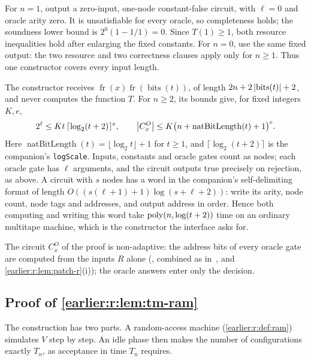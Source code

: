 For \(n=1\), output a zero-input, one-node constant-false circuit,
with \(\ell=0\) and oracle arity zero. It is unsatisfiable for every
oracle, so completeness holds; the soundness lower bound is
\(2^0(1-1/1)=0\). Since \(T(1)\ge1\), both resource inequalities hold
after enlarging the fixed constants. For \(n=0\), use the same fixed
output: the two resource and two correctness clauses apply only for
\(n\ge1\). Thus one constructor covers every input length.

The constructor receives
\(\operatorname{fr}(x)\operatorname{fr}(\operatorname{bits}(t))\), of
length \(2n+2\left|\operatorname{bits}(t)\right|+2\), and never computes the
function \(T\). For \(n\ge2\), its bounds give, for fixed integers
\(K,e\),
\[
 2^\ell\le Kt\,\lceil\log_2(t+2)\rceil^e,
 \qquad
 \left|C_x^O\right|\le K\bigl(n+\operatorname{natBitLength}(t)+1\bigr)^e.
\]
Here \(\operatorname{natBitLength}(t)=\lfloor\log_2t\rfloor+1\) for
\(t\ge1\), and \(\lceil\log_2(t+2)\rceil\) is the companion's
\texttt{logScale}. Inputs, constants and oracle gates count as nodes;
each oracle gate has \(\ell\) arguments, and the circuit outputs true
precisely on rejection, as above. A circuit with \(s\) nodes has a word
in the companion's self-delimiting format of length
\(O((s(\ell+1)+1)\log(s+\ell+2))\): write its arity, node count, node
tags and addresses, and output address in order. Hence both computing
and writing this word take \(\operatorname{poly}(n,\log(t+2))\) time on an ordinary
multitape machine, which is the constructor the interface asks for.

\begin{remark}\label{earlier:r:rem:short-pcp-nonadaptive}
The circuit \(C^O_x\) of the proof is non-adaptive: the address bits of
every oracle gate are computed from the inputs \(R\) alone
(\cite[Lemmas~12.16--12.20]{BCGT13}, combined as
in~\cite[Lemma~12.23]{BCGT13}, and \cref{earlier:r:lem:patch-r}(i)); the oracle
answers enter only the decision.
\end{remark}

\subsection{Proof of \texorpdfstring{\cref{earlier:r:lem:tm-ram}}{the random-access simulation}}

The construction has two parts. A random-access machine
(\cref{earlier:r:def:ram}) simulates \(V\) step by step. An idle phase then makes
the number of configurations exactly \(T_n\), as acceptance in time
\(T_n\) requires.

